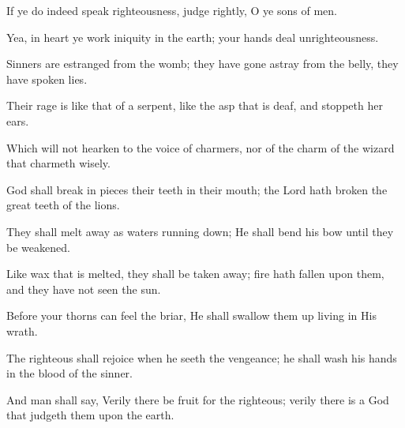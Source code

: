 If ye do indeed speak righteousness, judge rightly, O ye sons of men.

Yea, in heart ye work iniquity in the earth; your hands deal unrighteousness.

Sinners are estranged from the womb; they have gone astray from the belly, they have spoken lies.

Their rage is like that of a serpent, like the asp that is deaf, and stoppeth her ears.

Which will not hearken to the voice of charmers, nor of the charm of the wizard that charmeth wisely.

God shall break in pieces their teeth in their mouth; the Lord hath broken the great teeth of the lions.

They shall melt away as waters running down; He shall bend his bow until they be weakened.

Like wax that is melted, they shall be taken away; fire hath fallen upon them, and they have not seen the sun.

Before your thorns can feel the briar, He shall swallow them up living in His wrath.

The righteous shall rejoice when he seeth the vengeance; he shall wash his hands in the blood of the sinner.

And man shall say, Verily there be fruit for the righteous; verily there is a God that judgeth them upon the earth.
